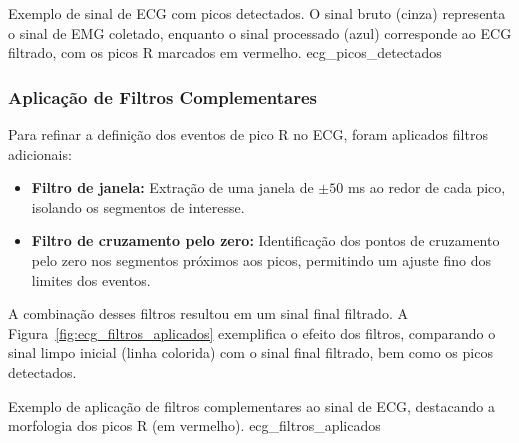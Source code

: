 {Exemplo de sinal de ECG com picos detectados. O sinal bruto (cinza) representa o sinal de EMG coletado, enquanto o sinal processado (azul) corresponde ao ECG filtrado, com os picos R marcados em vermelho.}
{ecg_picos_detectados}

\subsubsection{Aplicação de Filtros Complementares}
Para refinar a definição dos eventos de pico R no ECG, foram aplicados filtros adicionais:
\begin{itemize}
    \item \textbf{Filtro de janela:} Extração de uma janela de \(\pm50\) ms ao redor de cada pico, isolando os segmentos de interesse.
    \item \textbf{Filtro de cruzamento pelo zero:} Identificação dos pontos de cruzamento pelo zero nos segmentos próximos aos picos, permitindo um ajuste fino dos limites dos eventos.
\end{itemize}

A combinação desses filtros resultou em um sinal final filtrado. A Figura~\ref{fig:ecg_filtros_aplicados} exemplifica o efeito dos filtros, comparando o sinal limpo inicial (linha colorida) com o sinal final filtrado, bem como os picos detectados.

{Exemplo de aplicação de filtros complementares ao sinal de ECG, destacando a morfologia dos picos R (em vermelho).}
{ecg_filtros_aplicados}

